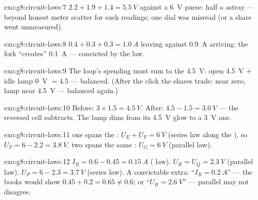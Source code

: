 \begin{solution}{exo:g8:circuit-laws:7}
$2.2 + 1.9 + 1.4 = \qty{5.5}{V}$ against a \qty{6}{V} purse:
half a  astray --- beyond honest meter scatter for such
readings; one dial was misread (or a share went unmeasured).
\end{solution}

\begin{solution}{exo:g8:circuit-laws:8}
$0.4 + 0.3 + 0.3 = \qty{1.0}{A}$ leaving against \qty{0.9}{A}
arriving: the fork ``creates'' \qty{0.1}{A} --- convicted by
the  law.
\end{solution}

\begin{solution}{exo:g8:circuit-laws:9}
The loop's spending must sum to the  \qty{4.5}{V}:
open  \qty{4.5}{V} $+$ idle lamp \qty{0}{V} $= 4.5$ ---
balanced. (After the click the shares trade:  near zero,
lamp near \qty{4.5}{V} --- balanced again.)
\end{solution}

\begin{solution}{exo:g8:circuit-laws:10}
Before: $3 \times 1.5 = \qty{4.5}{V}$. After: $4.5 - 1.5 =
\qty{3.0}{V}$ --- the reversed cell subtracts. The lamp dims
from its \qty{4.5}{V} glow to a \qty{3}{V} one.
\end{solution}

\begin{solution}{exo:g8:circuit-laws:11}
 one spans the : $U_E + U_F = \qty{6}{V}$ (series
 law along the ), so $U_F = 6 - 2.2 =
\qty{3.8}{V}$.  two spans the same : $U_G =
\qty{6}{V}$ (parallel  law).
\end{solution}

\begin{solution}{exo:g8:circuit-laws:12}
$I_R = 0.6 - 0.45 = \qty{0.15}{A}$ ( law). $U_R = U_Q
= \qty{2.3}{V}$ (parallel  law). $U_P = 6 - 2.3 =
\qty{3.7}{V}$ (series  law). A convictable extra:
``$I_R = \qty{0.2}{A}$'' --- the  books would show
$0.45 + 0.2 = 0.65 \neq 0.6$; or ``$U_R = \qty{2.6}{V}$'' ---
parallel  may not disagree.
\end{solution}

